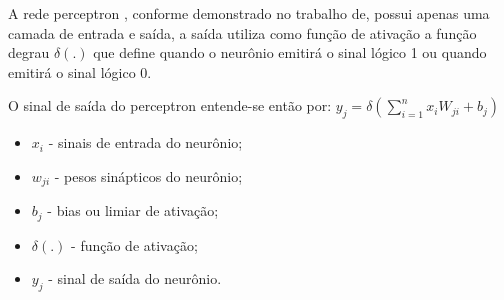 \documentclass[	12pt, Times, openright, twoside, a4paper, english, brazil]{abntex2}
\begin{document}
  	  	  \begin{figure}[H]
  	  	   \end{figure}

            A rede perceptron , conforme demonstrado no trabalho de\cite{Flavia2014}, possui apenas uma camada de entrada e saída, a saída utiliza como função de ativação a função degrau $ \delta(.) $ que define quando o neurônio emitirá o sinal lógico 1 ou quando emitirá o sinal lógico 0.

            O sinal de saída do perceptron entende-se então por:
            $y_j= \delta(\sum_{i=1}^{n}x_i W_{ji}+b_j)$
            \begin{itemize}
            	\item $ x_i $ - sinais de entrada do neurônio;
            	\item $ w_{ji} $ - pesos sinápticos do neurônio;
            	\item $ b_j $ - bias ou limiar de ativação;
            	\item $ \delta(.) $ - função de ativação;
            	\item $ y_j $ - sinal de saída do neurônio.
            \end{itemize}
			
            \begin{figure}[H]
            \end{figure}
			
\end{document}
